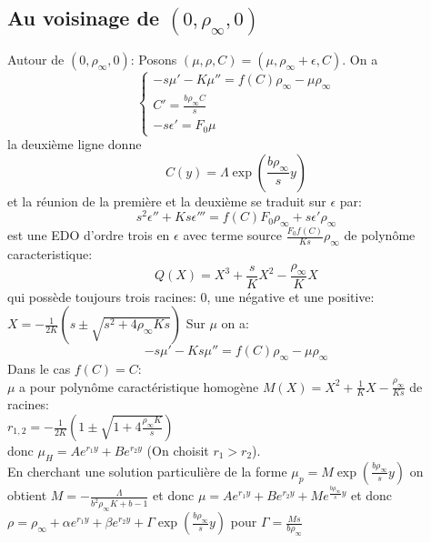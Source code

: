 \documentclass[11pt]{article}
\begin{document}
\subsection{Au voisinage de $(0,\rho_\infty,0)$} 
Autour de $(0,\rho_\infty,0)$:
Posons $(\mu,\rho,C)=(\mu, \rho_\infty + \epsilon, C)$. On a \\
\begin{equation} \left\{ \begin{array}{ll} -s \mu'-K\mu''=f(C)\rho_\infty-\mu\rho_\infty\\C'=\frac{b\rho_\infty C}{s} \\
-s\epsilon'= F_0\mu \end{array}\right.
\end{equation}
la deuxième ligne donne \begin{equation}
C(y) = \Lambda\exp(\frac{b\rho_\infty}{s}y )
\end{equation}
et la réunion de la première et la deuxième se traduit sur $\epsilon$ par:
\begin{equation}
	s^2 \epsilon''+Ks\epsilon'''=f(C)F_0\rho_\infty+s\epsilon'\rho_\infty
\end{equation} est une EDO d'ordre trois en $\epsilon$ avec terme source $\frac{F_0f(C)}{Ks} \rho_\infty$ de polynôme caracteristique: \begin{equation}
	Q(X)=X^3+\frac{s}{K}X^2-\frac{\rho_\infty}{K}X
\end{equation}
qui possède toujours trois racines:  $0$, une négative et une positive: $X= - \frac{1}{2K}(s \pm \sqrt{s^2+4\rho_\infty Ks})$
Sur $\mu$ on a: \begin{equation}
	-s \mu'-Ks\mu''=f(C)\rho_\infty-\mu\rho_\infty
\end{equation}
Dans le cas $f(C)=C$:\\
$\mu$ a pour polynôme caractéristique homogène $M(X)=X^2 +\frac{1}{K}X - \frac{\rho_\infty}{Ks}$ de racines:\\$r_{1,2}= - \frac{1}{2K}(1 \pm \sqrt{1+4 \frac{\rho_\infty K}{s}})$ \\ donc $\mu_H = Ae^{r_1y}+ Be^{r_2y}$ (On choisit $r_1>r_2$).\\
En cherchant une solution particulière de la forme $\mu_p =M\exp(\frac{b\rho_\infty}{s}y )$ on obtient $M = - \frac{\Lambda}{b^2\rho_\infty K + b - 1}$ et donc $\mu=Ae^{r_1y}+ Be^{r_2y}+M e^{\frac{b\rho_\infty}{s}y }$
et donc $\rho = \rho_\infty + \alpha e^{r_1y} + \beta e^{r_2y} + \Gamma \exp(\frac{b\rho_\infty}{s}y)$ pour $\Gamma = \frac{Ms}{b\rho_\infty} $

\ifdefined\COMPLETE
\else
\end{document}
